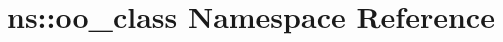 \hypertarget{namespacens_1_1oo__class}{}\section{ns\+:\+:oo\+\_\+class Namespace Reference}
\label{namespacens_1_1oo__class}
